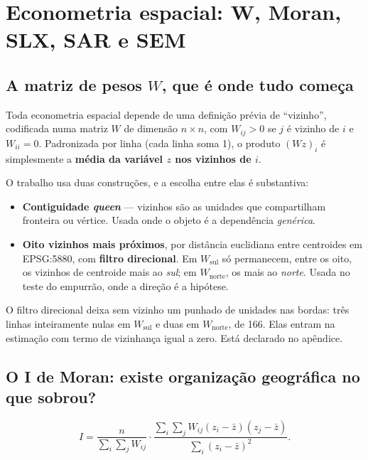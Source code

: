 \chapter{Econometria espacial: W, Moran, SLX, SAR e SEM}
\label{cap:espacial}

\section{A matriz de pesos $W$, que é onde tudo começa}

Toda econometria espacial depende de uma definição prévia de ``vizinho'',
codificada numa matriz $W$ de dimensão $n \times n$, com $W_{ij} > 0$ se $j$ é
vizinho de $i$ e $W_{ii} = 0$. Padronizada por linha (cada linha soma 1), o
produto $(W z)_i$ é simplesmente a \textbf{média da variável $z$ nos vizinhos de
$i$}.

O trabalho usa duas construções, e a escolha entre elas é substantiva:

\begin{itemize}
\item \textbf{Contiguidade \emph{queen}} --- vizinhos são as unidades que
compartilham fronteira ou vértice. Usada onde o objeto é a dependência
\emph{genérica}.
\item \textbf{Oito vizinhos mais próximos}, por distância euclidiana entre
centroides em EPSG:5880, com \textbf{filtro direcional}. Em
$W_{\mathrm{sul}}$ só permanecem, entre os oito, os vizinhos de centroide mais
ao \emph{sul}; em $W_{\mathrm{norte}}$, os mais ao \emph{norte}. Usada no teste
do empurrão, onde a direção é a hipótese.
\end{itemize}

\begin{armadilha}
O filtro direcional deixa sem vizinho um punhado de unidades nas bordas: três
linhas inteiramente nulas em $W_{\mathrm{sul}}$ e duas em $W_{\mathrm{norte}}$,
de 166. Elas entram na estimação com termo de vizinhança igual a zero. Está
declarado no apêndice.
\end{armadilha}

\section{O I de Moran: existe organização geográfica no que sobrou?}

\begin{equation}
I = \frac{n}{\sum_i \sum_j W_{ij}} \cdot
\frac{\sum_i \sum_j W_{ij} (z_i - \bar{z})(z_j - \bar{z})}{\sum_i (z_i - \bar{z})^2}.
\end{equation}

